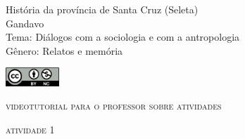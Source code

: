 \documentclass[smaller,professionalfonts,15pt]{beamer}
\begin{document}
										\begin{frame}\begin{raggedleft}
										\Huge 
História da província de Santa Cruz	(Seleta)					\\
										\huge 
Gandavo								\\
										\bigskip
										\normalsize
Tema: Diálogos com a sociologia e com a antropologia		\\	
Gênero: Relatos e memória			\\\vfill\hfill
\publishername

										\end{raggedleft}

\smallskip\includegraphics[width=2cm]{ccbync.png}\hfill
\end{frame}


\begin{frame}{\textsc{videotutorial para o professor sobre atividades}}
\vspace{-2cm}\begin{figure}
\end{figure}
\end{frame}


\begin{frame}
\hfill\Huge
\textsc{atividade 1}
\end{frame}
\end{document}
